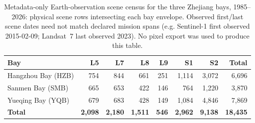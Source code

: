 \begin{table}[t]
\centering
\small
\caption{Metadata-only Earth-observation scene census for the three
Zhejiang bays, 1985--2026: physical scene rows intersecting each bay
envelope. Observed first/last scene dates need not match declared
mission spans (e.g. Sentinel-1 first observed 2015-02-09; Landsat~7 last
observed 2023). No pixel export was used to produce this table.}
\label{tab:census}
\begin{tabular}{lrrrrrrr}
\toprule
Bay & L5 & L7 & L8 & L9 & S1 & S2 & Total \\
\midrule
Hangzhou Bay (HZB) & 754 & 844 & 661 & 251 & 1{,}114 & 3{,}072 & 6{,}696 \\
Sanmen Bay (SMB)   & 665 & 653 & 422 & 146 & 764 & 1{,}220 & 3{,}870 \\
Yueqing Bay (YQB)  & 679 & 683 & 428 & 149 & 1{,}084 & 4{,}846 & 7{,}869 \\
\midrule
\textbf{Total} & \textbf{2{,}098} & \textbf{2{,}180} & \textbf{1{,}511} &
\textbf{546} & \textbf{2{,}962} & \textbf{9{,}138} & \textbf{18{,}435} \\
\bottomrule
\end{tabular}
\end{table}
